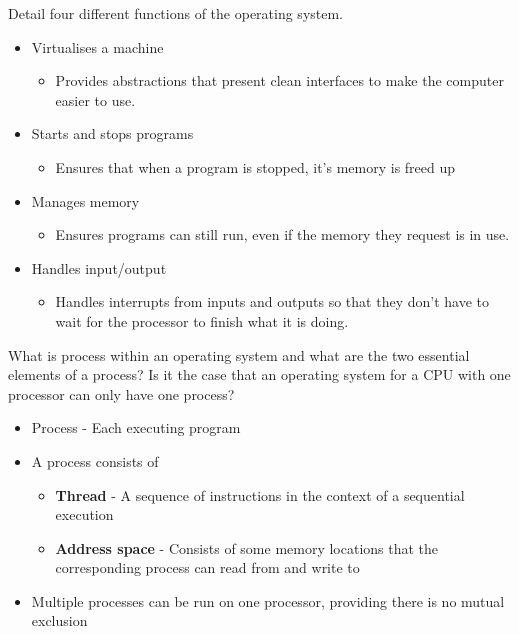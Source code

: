 \documentclass[addpoints]{exam}
\begin{document}
\begin{questions}
\question[4]Detail four different functions of the operating system.
\begin{solution}[2in]
	\begin{itemize}
		\item Virtualises a machine
		\begin{itemize}
			\item Provides abstractions that present clean interfaces to make the computer easier to use.
		\end{itemize}
		\item Starts and stops programs
		\begin{itemize}
			\item Ensures that when a program is stopped, it's memory is freed up
		\end{itemize}
		\item Manages memory
		\begin{itemize}
			\item Ensures programs can still run, even if the memory they request is in use.
		\end{itemize}
		\item Handles input/output
		\begin{itemize}
			\item Handles interrupts from inputs and outputs so that they don't have to wait for the processor to finish what it is doing.
		\end{itemize}
	\end{itemize}
\end{solution}

\question[5]What is process within an operating system and what are the two essential elements of a process? Is it the case that an operating system for a CPU with one processor can only have one process?
\begin{solution}[2in]
	\begin{itemize}
		\item Process - Each executing program
		\item A process consists of
		\begin{itemize}
			\item \textbf{Thread} - A sequence of instructions in the context of a sequential execution
			\item \textbf{Address space} - Consists of some memory locations that the corresponding process can read from and write to
		\end{itemize}
		\item Multiple processes can be run on one processor, providing there is no mutual exclusion 
	\end{itemize}
\end{solution}


\end{questions}
\end{document}
